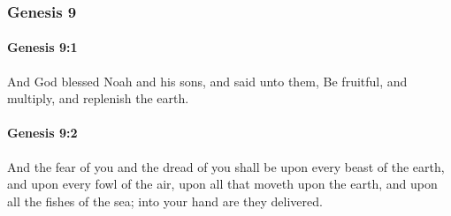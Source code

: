 	\subsubsection{Genesis 9} %
		\label{GENESIS-9}

		\paragraph{Genesis 9:1} %
			\label{GENESIS-9-1}

			And God blessed Noah and his sons, and said unto them, Be fruitful, and multiply, and replenish the earth.


		\paragraph{Genesis 9:2} %
			\label{GENESIS-9-2}

			And the fear of you and the dread of you shall be upon every beast of the earth, and upon every fowl of the air, upon all that moveth upon the earth, and upon all the fishes of the sea; into your hand are they delivered.

